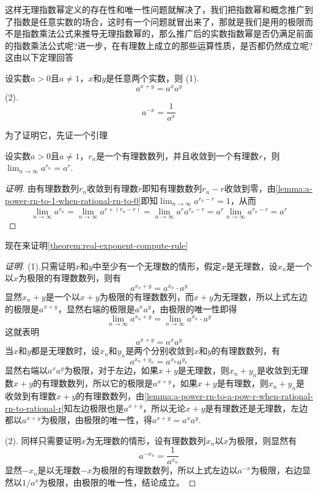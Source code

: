 这样无理指数幂定义的存在性和唯一性问题就解决了，我们把指数幂和概念推广到了指数是任意实数的场合，这时有一个问题就冒出来了，那就是我们是用的极限而不是指数乘法公式来推导无理指数幂的，那么推广后的实数指数幂是否仍满足前面的指数乘法公式呢?进一步，在有理数上成立的那些运算性质，是否都仍然成立呢? 这由以下定理回答
\begin{theorem}
  \label{theorem:real-exponent-compute-rule}
  设实数$a>0$且$a \neq 1$，$x$和$y$是任意两个实数，则
  (1).
  \[ a^{x+y} = a^xa^y \]
  (2).
  \[ a^{-x} = \frac{1}{a^x} \]
\end{theorem}

为了证明它，先证一个引理
\begin{lemma}
  \label{lemma:a-power-rn-to-a-pow-r-when-rational-rn-to-rational-r}
  设实数$a>0$且$a \neq 1$，$r_n$是一个有理数数列，并且收敛到一个有理数$r$，则$\lim_{n \to \infty} a^{r_n} = a^{r}$.
\end{lemma}

\begin{proof}[证明]
  由有理数数列$r_n$收敛到有理数$r$即知有理数数列$r_n-r$收敛到零，由\autoref{lemma:a-power-rn-to-1-when-rational-rn-to-0}即知$\lim_{n \to \infty}a^{r_n-r} = 1$，从而
  \[ \lim_{n \to \infty} a^{r_n} = \lim_{n \to \infty} a^{r+(r_n-r)} = \lim_{n \to \infty} a^ra^{r_n-r} = a^r \lim_{n \to \infty}a^{r_n-r} = a^r \]
\end{proof}

现在来证明\autoref{theorem:real-exponent-compute-rule}
\begin{proof}[证明]
  (1).只需证明$x$和$y$中至少有一个无理数的情形，假定$x$是无理数，设$x_n$是一个以$x$为极限的有理数数列，则有
  \[ a^{x_n+y} = a^{x_n} \cdot a^y \]
  显然$x_n+y$是一个以$x+y$为极限的有理数数列，而$x+y$为无理数，所以上式左边的极限是$a^{x+y}$，显然右端的极限是$a^xa^y$，由极限的唯一性即得
  \[ \lim_{n \to \infty}a^{x_n+y} = \lim_{n \to \infty}a^{x_n} \cdot a^y \]
  这就表明
  \[ a^{x+y} = a^xa^y \]
  当$x$和$y$都是无理数时，设$x_n$和$y_n$是两个分别收敛到$x$和$y$的有理数数列，有
  \[ a^{x_n+y_n} = a^{x_n}a^{y_n} \]
  显然右端以$a^xa^y$为极限，对于左边，如果$x+y$是无理数，则$x_n+y_n$是收敛到无理数$x+y$的有理数数列，所以它的极限是$a^{x+y}$，如果$x+y$是有理数，则$x_n+y_n$是收敛到有理数$x+y$的有理数数列，由\autoref{lemma:a-power-rn-to-a-pow-r-when-rational-rn-to-rational-r}知左边极限也是$a^{x+y}$，所以无论$x+y$是有理数还是无理数，左边都以$a^{x+y}$为极限，由极限的唯一性，得$a^{x+y}=a^xa^y$.

  (2). 同样只需要证明$x$为无理数的情形，设有理数数列$x_n$以$x$为极限，则显然有
  \[ a^{-x_n} = \frac{1}{a^{x_n}} \]
  显然$-x_n$是以无理数$-x$为极限的有理数数列，所以上式左边以$a^{-x}$为极限，右边显然以$1/a^x$为极限，由极限的唯一性，结论成立。
\end{proof}

